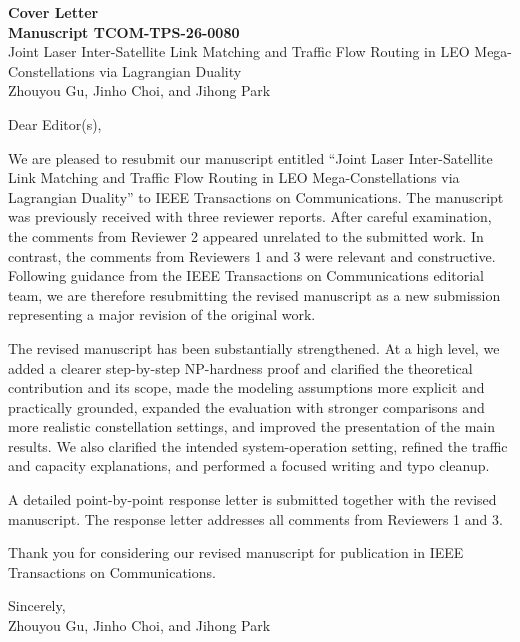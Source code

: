 \documentclass[11pt]{article}
\begin{document}
\begin{center}
{\Large\bfseries Cover Letter}\\[0.4em]
{\bfseries Manuscript TCOM-TPS-26-0080}\\[0.3em]
Joint Laser Inter-Satellite Link Matching and Traffic Flow Routing in LEO Mega-Constellations via Lagrangian Duality\\[0.3em]
Zhouyou Gu, Jinho Choi, and Jihong Park
\end{center}

\vspace{1em}

\noindent Dear Editor(s),

We are pleased to resubmit our manuscript entitled ``Joint Laser Inter-Satellite Link Matching and Traffic Flow Routing in LEO Mega-Constellations via Lagrangian Duality'' to IEEE Transactions on Communications. The manuscript was previously received with three reviewer reports. After careful examination, the comments from Reviewer 2 appeared unrelated to the submitted work. In contrast, the comments from Reviewers 1 and 3 were relevant and constructive. Following guidance from the IEEE Transactions on Communications editorial team, we are therefore resubmitting the revised manuscript as a new submission representing a major revision of the original work.

The revised manuscript has been substantially strengthened. At a high level, we added a clearer step-by-step NP-hardness proof and clarified the theoretical contribution and its scope, made the modeling assumptions more explicit and practically grounded, expanded the evaluation with stronger comparisons and more realistic constellation settings, and improved the presentation of the main results. We also clarified the intended system-operation setting, refined the traffic and capacity explanations, and performed a focused writing and typo cleanup.

A detailed point-by-point response letter is submitted together with the revised manuscript. The response letter addresses all comments from Reviewers 1 and 3.

Thank you for considering our revised manuscript for publication in IEEE Transactions on Communications.

\vspace{1em}

\noindent Sincerely,\\
Zhouyou Gu, Jinho Choi, and Jihong Park
\end{document}

